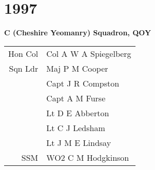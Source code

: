 \chapter*{1997}

\begin{center}
  \Large
  \textbf{C (Cheshire Yeomanry) Squadron, QOY}
\end{center}

\begin{center}
  \begin{tabular}{rl}
    Hon Col & Col A W A Spiegelberg \\
    Sqn Ldr & Maj P M Cooper \\
    & Capt J R Compston \\
    & Capt A M Furse \\
    & Lt D E Abberton \\
    & Lt C J Ledsham \\
    & Lt J M E Lindsay \\
    SSM & WO2 C M Hodgkinson \\
  \end{tabular}
\end{center}

